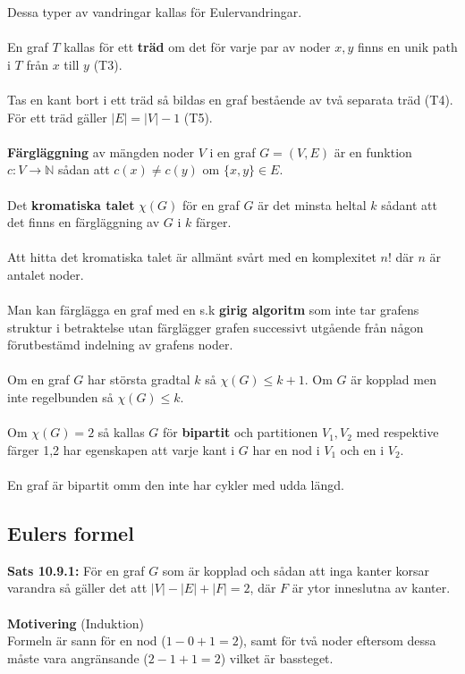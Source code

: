 \documentclass{article}
\begin{document}
Dessa typer av vandringar kallas för Eulervandringar.\\ \\ 
En graf $T$ kallas för ett \textbf{träd} om det för varje par av noder $x,y$ finns en unik path i $T$ från $x$ till $y$ (T3).\\ \\
Tas en kant bort i ett träd så bildas en graf bestående av två separata träd (T4). För ett träd gäller $|E|=|V|-1$ (T5).\\ \\ \textbf{Färgläggning} av mängden noder $V$ i en graf $G=(V,E)$ är en funktion $c:V\longrightarrow \mathbb{N}$ sådan att $c(x)\neq c(y)$ om $\{x,y\}\in E$.\\ \\ 
Det \textbf{kromatiska talet} $\chi(G)$ för en graf $G$ är det minsta heltal $k$ sådant att det finns en färgläggning av $G$ i $k$ färger.\\ \\ 
Att hitta det kromatiska talet är allmänt svårt med en komplexitet $n!$ där $n$ är antalet noder.\\ \\ 
Man kan färglägga en graf med en s.k \textbf{girig algoritm} som inte tar grafens struktur i betraktelse utan färglägger grafen successivt utgående från någon förutbestämd indelning av grafens noder.\\ \\ 
Om en graf $G$ har största gradtal $k$ så $\chi(G)\leq k+1$. Om $G$ är kopplad men inte regelbunden så $\chi(G)\leq k$.\\ \\ 
Om $\chi(G)=2$ så kallas $G$ för \textbf{bipartit} och partitionen $V_1,V_2$ med respektive färger 1,2 har egenskapen att varje kant i $G$ har en nod i $V_1$ och en i $V_2$.\\ \\ 
En graf är bipartit omm den inte har cykler med udda längd.

\subsection{Eulers formel}
\textbf{Sats 10.9.1:} För en graf $G$ som är kopplad och sådan att inga kanter korsar varandra så gäller det att $|V|-|E|+|F|=2$, där $F$ är ytor inneslutna av kanter.\\ \\ 
\textbf{Motivering} (Induktion)\\
Formeln är sann för en nod ($1-0+1=2$), samt för två noder eftersom dessa måste vara angränsande ($2-1+1=2$) vilket är bassteget. 
\end{document}
